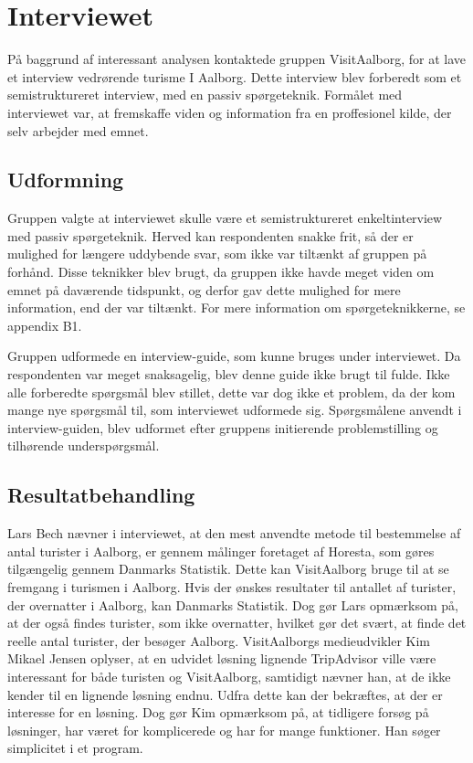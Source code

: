 \section{Interviewet}
På baggrund af interessant analysen kontaktede gruppen VisitAalborg, for at lave et interview vedrørende turisme I Aalborg. Dette interview blev forberedt som et semistruktureret interview, med en passiv spørgeteknik. Formålet med interviewet var, at fremskaffe viden og information fra en proffesionel kilde, der selv arbejder med emnet.
 
\subsection{Udformning}
Gruppen valgte at interviewet skulle være et semistruktureret enkeltinterview med passiv spørgeteknik. Herved kan respondenten snakke frit, så der er mulighed for længere uddybende svar, som ikke var tiltænkt af gruppen på forhånd. Disse teknikker blev brugt, da gruppen ikke havde meget viden om emnet på daværende tidspunkt, og derfor gav dette mulighed for mere information, end der var tiltænkt. For mere information om spørgeteknikkerne, se appendix B1.

Gruppen udformede en interview-guide, som kunne bruges under interviewet. Da respondenten var meget snaksagelig, blev denne guide ikke brugt til fulde. Ikke alle forberedte spørgsmål blev stillet, dette var dog ikke et problem, da der kom mange nye spørgsmål til, som interviewet udformede sig.  Spørgsmålene anvendt i interview-guiden, blev udformet efter gruppens initierende problemstilling og tilhørende underspørgsmål.
\subsection{Resultatbehandling}
Lars Bech nævner i interviewet, at den mest anvendte metode til bestemmelse af antal turister i Aalborg, er gennem målinger foretaget af Horesta, som gøres tilgængelig gennem Danmarks Statistik. Dette kan VisitAalborg bruge til at se fremgang i turismen i Aalborg. Hvis der ønskes resultater til antallet af turister, der overnatter i Aalborg, kan Danmarks Statistik. Dog gør Lars opmærksom på, at der også findes turister, som ikke overnatter, hvilket gør det svært, at finde det reelle antal turister, der besøger Aalborg.
VisitAalborgs medieudvikler Kim Mikael Jensen oplyser, at en udvidet løsning lignende TripAdvisor ville være interessant for både turisten og VisitAalborg, samtidigt nævner han, at de ikke kender til en lignende løsning endnu. Udfra dette kan der bekræftes, at der er interesse for en løsning. Dog gør Kim opmærksom på, at tidligere forsøg på løsninger, har været for komplicerede og har for mange funktioner. Han søger simplicitet i et program.

